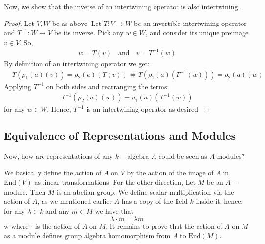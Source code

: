 Now, we show that the inverse of an intertwining operator is also intertwining.

\begin{proof}
Let $V,W$ be as above. Let $T: V \to W $ be an invertible intertwining operator and $T^{-1}: W \to V$ be its inverse. Pick any $w \in W$, and consider its unique preimage $v \in V$. So, 
\begin{align*}
w = T(v) \quad \text{and} \quad v = T^{-1}(w)
\end{align*}
 By definition of an intertwining operator we get:
\begin{align*}
   & T(\rho_1(a)(v)) = \rho_2(a)(T(v))
    \iff T(\rho_1(a)(T^{-1}(w))) = \rho_2(a)(w)
\end{align*}
Applying $T^{-1}$ on both sides and rearranging the terms:
\begin{align*}
    T^{-1}(\rho_2(a)(w))= \rho_1(a)(T^{-1}(w))
\end{align*}
for any $w \in W$. Hence, $T^{-1}$ is an intertwining operator as desired. 
\end{proof}
\subsection{Equivalence of Representations and Modules}
Now, how are representations of any $k-$algebra $A$ could be seen as $A$-modules?

We basically define the action of $A$ on $V$ by the action of the image of $A$ in $\text{End}(V)$ as linear transformations.
 For the other direction, Let $M$ be an $A-$module. Then $M$ is an abelian group. We define scalar multiplication via the action of $A$, as we mentioned earlier $A$ has a copy of the field $k$ inside it, hence: for any $\lambda \in k$ and any $m \in M$ we have that
 \[
 \lambda \cdot  m = \lambda m
 \]w
 where $\cdot$ is the action of $A$ on $M$. It remains to prove that the action of $A$ on $M$ as a module defines group algebra homomorphism from $A$ to $\text{End}(M)$.

